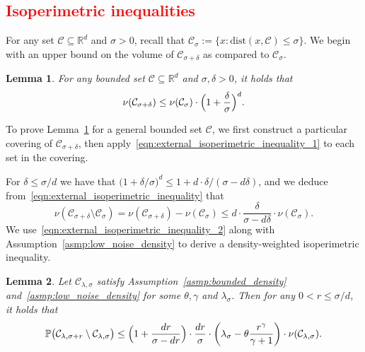 \documentclass{article}
\newcommand{\Reals}{\mathbb{R}}
\newcommand{\1}{\mathbf{1}}
\newcommand{\Rd}{\Reals^d}
\newcommand{\mc}[1]{\mathcal{#1}}
\newcommand{\Pbb}{\mathbb{P}}
\newtheorem{lemma}{Lemma}[section]
\theoremstyle{definition}
\theoremstyle{remark}
\begin{document}
\subsection{\textcolor{red}{Isoperimetric inequalities}}
\label{subsec:isoperimetric_inequalities}

For any set $\mc{C} \subseteq \Rd$ and $\sigma > 0$, recall that $\mc{C}_{\sigma} := \{x: \mathrm{dist}(x,\mc{C}) \leq \sigma\}$. We begin with an upper bound on the volume of $\mc{C}_{\sigma + \delta}$ as compared to $\mc{C}_{\sigma}$. 
\begin{lemma}
	\label{lem:external_isoperimetric_inequality}
	For any bounded set $\mc{C} \subseteq \Rd$ and  $\sigma, \delta > 0$, it holds that
	\begin{equation}
	\label{eqn:external_isoperimetric_inequality}
	\nu(\mc{C}_{\sigma + \delta}) \leq \nu(\mc{C}_{\sigma}) \cdot \Bigl(1 + \frac{\delta}{\sigma}\Bigr)^d.
	\end{equation}
\end{lemma}
To prove Lemma~\ref{lem:external_isoperimetric_inequality} for a general bounded set $\mc{C}$, we first construct a particular covering of $\mc{C}_{\sigma + \delta}$, then apply~\eqref{eqn:external_isoperimetric_inequality_1} to each set in the covering.

For $\delta \leq \sigma/d$ we have that $\bigl(1 + \delta/\sigma\bigr)^d \leq 1 + d \cdot \delta/(\sigma - d\delta)$, and we deduce from~\eqref{eqn:external_isoperimetric_inequality} that
\begin{equation}
\label{eqn:external_isoperimetric_inequality_2}
\nu(\mc{C}_{\sigma + \delta} \setminus \mc{C}_{\sigma}) = \nu(\mc{C}_{\sigma + \delta}) - \nu(\mc{C}_{\sigma}) \leq d \cdot \frac{\delta}{\sigma - d\delta} \cdot \nu(\mc{C}_{\sigma}).
\end{equation}
We use~\eqref{eqn:external_isoperimetric_inequality_2} along with Assumption~\ref{asmp:low_noise_density} to derive a density-weighted isoperimetric inequality. 
\begin{lemma}
	\label{lem:external_isoperimetric_inequality_density_weighted}
	Let $\mc{C}_{\lambda,\sigma}$ satisfy Assumption~\ref{asmp:bounded_density} and~\ref{asmp:low_noise_density} for some $\theta, \gamma$ and $\lambda_{\sigma}$. Then for any $0 < r \leq \sigma/d$, it holds that
	\begin{equation}
	\label{eqn:external_isoperimetric_inequality_density_weighted}
	\Pbb\bigl(\mc{C}_{\lambda,\sigma + r} \setminus \mc{C}_{\lambda,\sigma}\bigr) \leq \Bigl(1 + \frac{dr}{\sigma - dr}\Bigr) \cdot \frac{dr}{\sigma} \cdot \left(\lambda_{\sigma} - \theta\frac{r^{\gamma}}{\gamma + 1}\right) \cdot \nu(\mc{C}_{\lambda,\sigma}).
	\end{equation}
\end{lemma}
\end{document}
